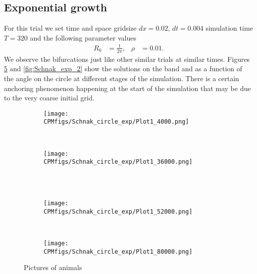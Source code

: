 \documentclass[fleqn,12pt]{siamart1116}
\begin{document}
\subsection{Exponential growth}
For this trial we set time and space gridsize $dx = 0.02$, $dt = 0.004$ simulation time $T = 320$ and the following parameter values
\begin{align}
R_0 &= \frac{1}{2\pi}, & \rho &= 0.01.\label{expparams}
\end{align}
We observe the bifurcations just like other similar trials at similar times. Figures \ref{fig:Schnak_exp_1} and \ref{fig:Schnak_exp_2} show the solutions on the band and as a function of the angle on the circle at different stages of the simulation. There is a certain anchoring phenomenon happening at the start of the simulation that may be due to the very coarse initial grid.
\begin{figure}
    \centering
    \begin{subfigure}[b]{0.45\textwidth}
        \texttt{[image: CPMfigs/Schnak\_circle\_exp/Plot1\_4000.png]}
        \label{fig:Schnak_exp_1-1}
    \end{subfigure}
    ~ %
    \begin{subfigure}[b]{0.45\textwidth}
        \texttt{[image: CPMfigs/Schnak\_circle\_exp/Plot1\_36000.png]}
        \label{fig:Schnak_exp_1-2}
    \end{subfigure}
		\\
    ~ %
    \begin{subfigure}[b]{0.45\textwidth}
        \texttt{[image: CPMfigs/Schnak\_circle\_exp/Plot1\_52000.png]}
        \label{fig:Schnak_exp_1-3}
    \end{subfigure}
		~
		\begin{subfigure}[b]{0.45\textwidth}
        \texttt{[image: CPMfigs/Schnak\_circle\_exp/Plot1\_80000.png]}
        \label{fig:Schnak_exp_1-4}
    \end{subfigure}
    \caption{Pictures of animals}\label{fig:Schnak_exp_1}
\end{figure}
\end{document}
